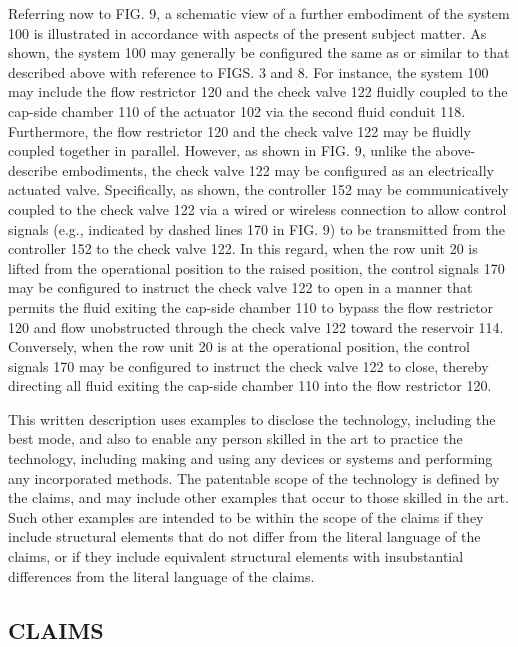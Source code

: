 \documentclass[11pt,a4paper]{article}
\begin{document}
Referring now to FIG. 9, a schematic view of a further embodiment of the system 100 is illustrated in accordance with aspects of the present subject matter. As shown, the system 100 may generally be configured the same as or similar to that described above with reference to FIGS. 3 and 8. For instance, the system 100 may include the flow restrictor 120 and the check valve 122 fluidly coupled to the cap-side chamber 110 of the actuator 102 via the second fluid conduit 118. Furthermore, the flow restrictor 120 and the check valve 122 may be fluidly coupled together in parallel. However, as shown in FIG. 9, unlike the above-describe embodiments, the check valve 122 may be configured as an electrically actuated valve. Specifically, as shown, the controller 152 may be communicatively coupled to the check valve 122 via a wired or wireless connection to allow control signals (e.g., indicated by dashed lines 170 in FIG. 9) to be transmitted from the controller 152 to the check valve 122. In this regard, when the row unit 20 is lifted from the operational position to the raised position, the control signals 170 may be configured to instruct the check valve 122 to open in a manner that permits the fluid exiting the cap-side chamber 110 to bypass the flow restrictor 120 and flow unobstructed through the check valve 122 toward the reservoir 114. Conversely, when the row unit 20 is at the operational position, the control signals 170 may be configured to instruct the check valve 122 to close, thereby directing all fluid exiting the cap-side chamber 110 into the flow restrictor 120.

This written description uses examples to disclose the technology, including the best mode, and also to enable any person skilled in the art to practice the technology, including making and using any devices or systems and performing any incorporated methods. The patentable scope of the technology is defined by the claims, and may include other examples that occur to those skilled in the art. Such other examples are intended to be within the scope of the claims if they include structural elements that do not differ from the literal language of the claims, or if they include equivalent structural elements with insubstantial differences from the literal language of the claims.

\subsection{CLAIMS}
\end{document}
